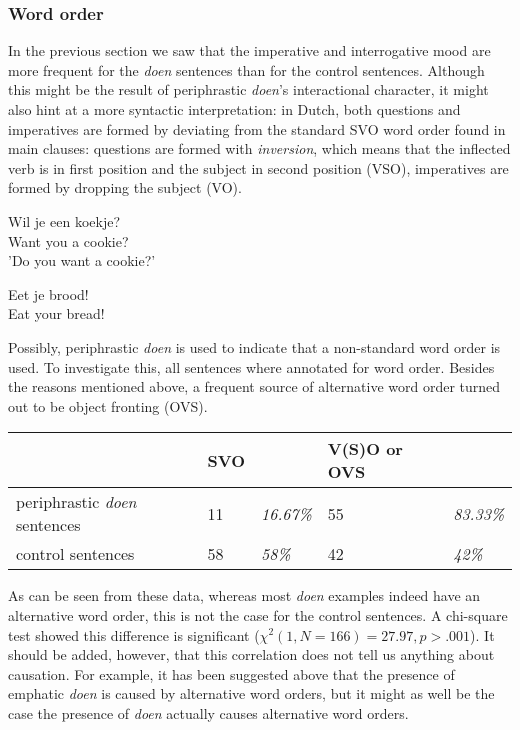 \documentclass[12pt]{article}
\begin{document}
\subsubsection{Word order}

In the previous section we saw that the imperative and interrogative mood are more frequent for the \emph{doen} sentences than for the control sentences. Although this might be the result of periphrastic \emph{doen}'s interactional character, it might also hint at a more syntactic interpretation: in Dutch, both questions and imperatives are formed by deviating from the standard SVO word order found in main clauses: questions are formed with \emph{inversion}, which means that the inflected verb is in first position and the subject in second position (VSO), imperatives are formed by dropping the subject (VO).

\begin{exe}
\ex \gll Wil je een koekje?\\
Want you a cookie?\\
'Do you want a cookie?'

\ex \gll Eet je brood!\\
Eat your bread!\\
\end{exe}

Possibly, periphrastic \emph{doen} is used to indicate that a non-standard word order is used. To investigate this, all sentences where annotated for word order. Besides the reasons mentioned above, a frequent source of alternative word order turned out to be object fronting (OVS).

\begin{table}[h]
\begin{tabular}{|l||ll|ll|}
\hline
&SVO&&V(S)O or OVS&\\
\hline
periphrastic \emph{doen} sentences	&11		 &\emph{16.67\%}&55 	& \emph{83.33\%}	\\
control sentences					&58		 &\emph{58\%}	&42		& \emph{42\%}		\\
\hline
\end{tabular}
\end{table}

As can be seen from these data, whereas most \emph{doen} examples indeed have an alternative word order, this is not the case for the control sentences. A chi-square test showed this difference is significant ($\chi^2(1, N=166) = 27.97, p > .001$). It should be added, however, that this correlation does not tell us anything about causation. For example, it has been suggested above that the presence of emphatic \emph{doen} is caused by alternative word orders, but it might as well be the case the presence of \emph{doen} actually causes alternative word orders.
\end{document}

